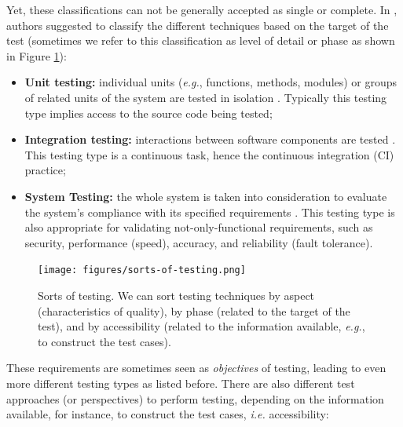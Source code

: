 Yet, these classifications can not be generally accepted as
single or complete. In \cite{4425813}, authors suggested to
classify the different techniques based on the target of the test
(sometimes we refer to this classification as level of detail or
phase as shown in Figure \ref{fig:sorts-of-testing}):

\begin{itemize}
    \item \textbf{Unit testing:} individual units (\emph{e.g.},
        functions, methods, modules) or groups of related units
        of the system are tested in isolation
        \cite{ieee610121990}. Typically this testing type implies
        access to the source code being tested;

    \item \textbf{Integration testing:} interactions between
        software components are tested \cite{ieee610121990}. This
        testing type is a continuous task, hence the continuous
        integration (CI) practice;

    \item \textbf{System Testing:} the whole system is taken into
        consideration to evaluate the system's compliance with
        its specified requirements \cite{ieee610121990}. This
        testing type is also appropriate for validating
        not-only-functional requirements, such as security,
        performance (speed), accuracy, and reliability (fault
        tolerance).
\end{itemize}

\begin{figure}[ht]
    \begin{center}
    \texttt{[image: figures/sorts-of-testing.png]}
    \end{center}

    \caption{Sorts of testing. We can sort testing techniques by
    aspect (characteristics of quality), by phase (related to the
    target of the test), and by accessibility (related to the
    information available, \emph{e.g.}, to construct the test
    cases).}
    \label{fig:sorts-of-testing}
\end{figure}

These requirements are sometimes seen as \textit{objectives} of
testing, leading to even more different testing types as listed
before. There are also different test approaches \cite{5733835}
(or perspectives) to perform testing, depending on the
information available, for instance, to construct the test cases,
\emph{i.e.} accessibility:

